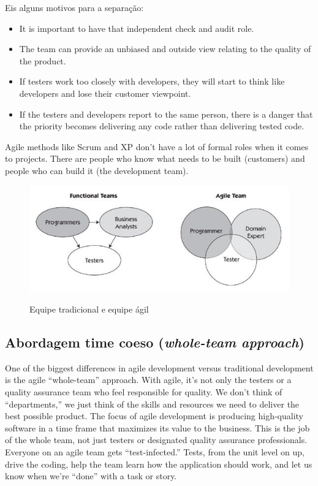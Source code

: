 \documentclass[
	12pt,				%
	openright,			%
	oneside,			%
	a4paper,			%
	english,			%
	brazil,				%
	]{abntex2}
\begin{document}
Eis alguns motivos para a separação:

\begin{itemize}
    \item It is important to have that independent check and audit role.
    \item The team can provide an unbiased and outside view relating to the quality of the product.
    \item If testers work too closely with developers, they will start to think like developers and lose their customer viewpoint.
    \item If the testers and developers report to the same person, there is a danger that the priority becomes delivering any code rather than delivering tested code.
\end{itemize}


Agile methods like Scrum and XP don’t have a lot of formal roles when it comes to projects. There are people who know what needs to be built (customers) and people who can build it (the development team).


\begin{figure}[H]
    \centering
    \caption{Equipe tradicional e equipe ágil}
    \graphicspath{ {./graphics/agile/} }
    \includegraphics[scale=1.0]{functional-and-agile-teams}
    \label{fig:functional-and-agile-teams}
\end{figure}

\subsection{Abordagem time coeso (\emph{whole-team approach})}

One of the biggest differences in agile development versus traditional development is the agile “whole-team” approach. With agile, it’s not only the testers or a quality assurance team who feel responsible for quality. We don’t think of “departments,” we just think of the skills and resources we need to deliver the best possible product. The focus of agile development is producing high-quality software in a time frame that maximizes its value to the business. This is the job of the whole team, not just testers or designated quality assurance professionals. Everyone on an agile team gets “test-infected.” Tests, from the unit level on up, drive the coding, help the team learn how the application should work, and let us know when we’re “done” with a task or story.
\end{document}
